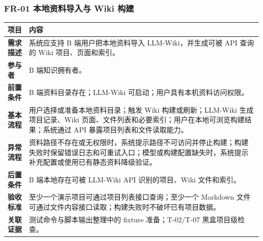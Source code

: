 \documentclass[UTF8,a4paper,12pt,fontset=fandol]{ctexart}
\newcommand{\code}[1]{\texorpdfstring{\begingroup\footnotesize\detokenize{#1}\endgroup}{#1}}
\begin{document}
\subsubsection{FR-01 本地资料导入与 Wiki 构建}
\begin{longtable}{>{\bfseries}p{2.4cm}p{11.8cm}}
\toprule
项目 & 内容 \\
\midrule
需求描述 & 系统应支持 B 端用户把本地资料导入 LLM-Wiki，并生成可被 API 查询的 Wiki 项目、页面和索引。 \\
参与者 & B 端知识拥有者。 \\
前置条件 & B 端资料目录存在；LLM-Wiki 可启动；用户具有本机资料访问权限。 \\
基本流程 & 用户选择或准备本地资料目录；触发 Wiki 构建或刷新；LLM-Wiki 生成项目记录、Wiki 页面、文件列表和必要索引；用户在本地可浏览构建结果；系统通过 API 暴露项目列表和文件读取能力。 \\
异常流程 & 资料路径不存在或无权限时，系统提示路径不可访问并停止构建；构建失败时保留错误日志和可重试入口；模型或构建配置缺失时，系统提示补充配置或使用已有静态资料降级验证。 \\
后置条件 & B 端本地存在可被 LLM-Wiki API 识别的项目、Wiki 文件和索引。 \\
验收标准 & 至少一个演示项目可通过项目列表接口查询；至少一个 Markdown 文件可通过文件内容接口读取；构建失败时不破坏已有项目数据。 \\
关联证据 & 测试命令与脚本输出整理中的 \code{sample-wiki} fixture 准备；T-02/T-07 黑盒项目级检查。 \\
\bottomrule
\end{longtable}
\end{document}
